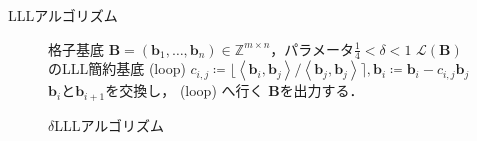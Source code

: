 \documentclass[dvipdfm]{beamer}
\theoremstyle{example}
\begin{document}
\begin{frame}{LLLアルゴリズム}
    \begin{figure}[!t]
        \begin{algorithm}[H]
            \caption{$\delta$LLLアルゴリズム}
            \label{alg_deltaLLL}
            \begin{algorithmic}[1]
                \small
                \renewcommand{\algorithmicrequire}{\textbf{Input:}}
                \renewcommand{\algorithmicensure}{\textbf{Output:}}
                \REQUIRE 格子基底 $\boldsymbol{B} = \left(\boldsymbol{b}_1,\ldots,\boldsymbol{b}_n\right) \in \mathbb{Z}^{m\times n}$，パラメータ$\frac{1}{4}< \delta <1$
                \ENSURE $\mathcal{L}\left(\boldsymbol{B}\right)$のLLL簡約基底
                \STATE (loop)
                \STATE $c_{i,j} \coloneqq \lfloor \left<\boldsymbol{b}_i,\boldsymbol{b}_j\right> / \left< \boldsymbol{b}_j, \boldsymbol{b}_j\right> \rceil, \boldsymbol{b}_i \coloneqq \boldsymbol{b}_i -c_{i,j}\boldsymbol{b}_j$
                \ENDFOR
                \ENDFOR
                \STATE $\boldsymbol{b}_i$と$\boldsymbol{b}_{i+1}$を交換し， (loop) へ行く
                \ENDIF
                \ENDFOR
                \STATE $\boldsymbol{B}$を出力する．
            \end{algorithmic}
        \end{algorithm}
    \end{figure}
\end{frame}
\end{document}
